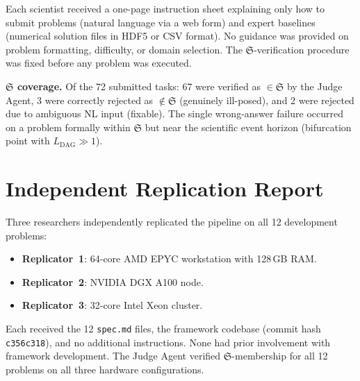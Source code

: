 \documentclass[11pt,a4paper]{article}
\newcommand{\Sclass}{\mathfrak{S}}
\begin{document}
Each scientist received a one-page instruction sheet explaining only how to submit problems (natural language via a web form) and expert baselines (numerical solution files in HDF5 or CSV format). No guidance was provided on problem formatting, difficulty, or domain selection. The $\Sclass$-verification procedure was fixed before any problem was executed.

\textbf{$\Sclass$ coverage.} Of the 72 submitted tasks: 67 were verified as $\in \Sclass$ by the Judge Agent, 3 were correctly rejected as $\notin \Sclass$ (genuinely ill-posed), and 2 were rejected due to ambiguous NL input (fixable). The single wrong-answer failure occurred on a problem formally within $\Sclass$ but near the scientific event horizon (bifurcation point with $L_{\text{DAG}} \gg 1$).

\section{Independent Replication Report}
\label{sec:s6}

Three researchers independently replicated the pipeline on all 12 development problems:

\begin{itemize}[nosep]
\item \textbf{Replicator~1}: 64-core AMD EPYC workstation with 128\,GB RAM.
\item \textbf{Replicator~2}: NVIDIA DGX A100 node.
\item \textbf{Replicator~3}: 32-core Intel Xeon cluster.
\end{itemize}

Each received the 12 \texttt{spec.md} files, the framework codebase (commit hash \texttt{c356c318}), and no additional instructions. None had prior involvement with framework development. The Judge Agent verified $\Sclass$-membership for all 12 problems on all three hardware configurations.
\end{document}
